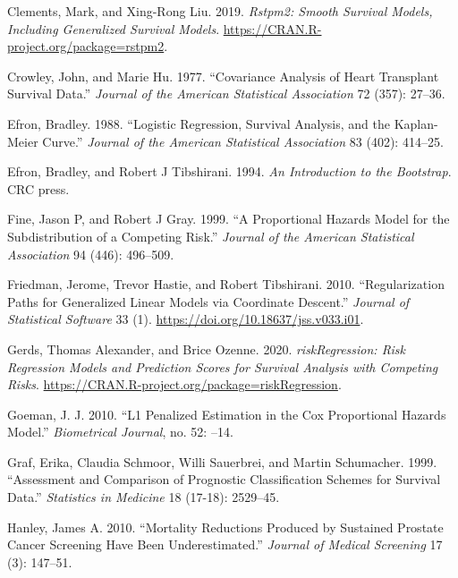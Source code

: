 \begin{CSLReferences}{1}{0}
\leavevmode{}%
Clements, Mark, and Xing-Rong Liu. 2019. \emph{Rstpm2: Smooth Survival Models, Including Generalized Survival Models}. \url{https://CRAN.R-project.org/package=rstpm2}.

\leavevmode{}%
Crowley, John, and Marie Hu. 1977. {``Covariance Analysis of Heart Transplant Survival Data.''} \emph{Journal of the American Statistical Association} 72 (357): 27--36.

\leavevmode{}%
Efron, Bradley. 1988. {``Logistic Regression, Survival Analysis, and the Kaplan-Meier Curve.''} \emph{Journal of the American Statistical Association} 83 (402): 414--25.

\leavevmode{}%
Efron, Bradley, and Robert J Tibshirani. 1994. \emph{An Introduction to the Bootstrap}. CRC press.

\leavevmode{}%
Fine, Jason P, and Robert J Gray. 1999. {``A Proportional Hazards Model for the Subdistribution of a Competing Risk.''} \emph{Journal of the American Statistical Association} 94 (446): 496--509.

\leavevmode{}%
Friedman, Jerome, Trevor Hastie, and Robert Tibshirani. 2010. {``Regularization Paths for Generalized Linear Models via Coordinate Descent.''} \emph{Journal of Statistical Software} 33 (1). \url{https://doi.org/10.18637/jss.v033.i01}.

\leavevmode{}%
Gerds, Thomas Alexander, and Brice Ozenne. 2020. \emph{riskRegression: Risk Regression Models and Prediction Scores for Survival Analysis with Competing Risks}. \url{https://CRAN.R-project.org/package=riskRegression}.

\leavevmode{}%
Goeman, J. J. 2010. {``L1 Penalized Estimation in the Cox Proportional Hazards Model.''} \emph{Biometrical Journal}, no. 52: --14.

\leavevmode{}%
Graf, Erika, Claudia Schmoor, Willi Sauerbrei, and Martin Schumacher. 1999. {``Assessment and Comparison of Prognostic Classification Schemes for Survival Data.''} \emph{Statistics in Medicine} 18 (17-18): 2529--45.

\leavevmode{}%
Hanley, James A. 2010. {``Mortality Reductions Produced by Sustained Prostate Cancer Screening Have Been Underestimated.''} \emph{Journal of Medical Screening} 17 (3): 147--51.


\end{CSLReferences}
